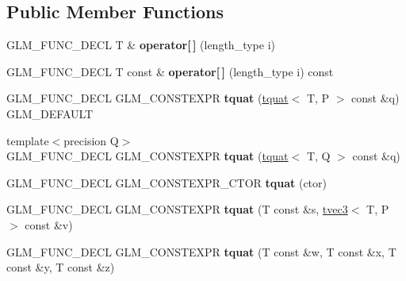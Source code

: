 \subsection*{Public Member Functions}
\begin{DoxyCompactItemize}
\item 
\mbox{\label{structglm_1_1tquat_a7c9434d6e90ddc03ed8b91770765303c}} 
G\+L\+M\+\_\+\+F\+U\+N\+C\+\_\+\+D\+E\+CL T \& {\bfseries operator\mbox{[}$\,$\mbox{]}} (length\+\_\+type i)
\item 
\mbox{\label{structglm_1_1tquat_a868440e3dade7ee013bf9114285b8790}} 
G\+L\+M\+\_\+\+F\+U\+N\+C\+\_\+\+D\+E\+CL T const  \& {\bfseries operator\mbox{[}$\,$\mbox{]}} (length\+\_\+type i) const
\item 
\mbox{\label{structglm_1_1tquat_aa7af0d1b2fd1ed7db63d48b241b295ca}} 
G\+L\+M\+\_\+\+F\+U\+N\+C\+\_\+\+D\+E\+CL G\+L\+M\+\_\+\+C\+O\+N\+S\+T\+E\+X\+PR {\bfseries tquat} (\hyperlink{structglm_1_1tquat}{tquat}$<$ T, P $>$ const \&q) G\+L\+M\+\_\+\+D\+E\+F\+A\+U\+LT
\item 
\mbox{\label{structglm_1_1tquat_aaf9a4d10e16ad975e4462b5c89ce724d}} 
{\footnotesize template$<$precision Q$>$ }\\G\+L\+M\+\_\+\+F\+U\+N\+C\+\_\+\+D\+E\+CL G\+L\+M\+\_\+\+C\+O\+N\+S\+T\+E\+X\+PR {\bfseries tquat} (\hyperlink{structglm_1_1tquat}{tquat}$<$ T, Q $>$ const \&q)
\item 
\mbox{\label{structglm_1_1tquat_a8a907726f9a12c025b8dbb572e951e36}} 
G\+L\+M\+\_\+\+F\+U\+N\+C\+\_\+\+D\+E\+CL G\+L\+M\+\_\+\+C\+O\+N\+S\+T\+E\+X\+P\+R\+\_\+\+C\+T\+OR {\bfseries tquat} (ctor)
\item 
\mbox{\label{structglm_1_1tquat_aa8e343ea23faf2cada6fc99d8e6eb597}} 
G\+L\+M\+\_\+\+F\+U\+N\+C\+\_\+\+D\+E\+CL G\+L\+M\+\_\+\+C\+O\+N\+S\+T\+E\+X\+PR {\bfseries tquat} (T const \&s, \hyperlink{structglm_1_1tvec3}{tvec3}$<$ T, P $>$ const \&v)
\item 
\mbox{\label{structglm_1_1tquat_ace891412cac049ef9bbafe069779a2c2}} 
G\+L\+M\+\_\+\+F\+U\+N\+C\+\_\+\+D\+E\+CL G\+L\+M\+\_\+\+C\+O\+N\+S\+T\+E\+X\+PR {\bfseries tquat} (T const \&w, T const \&x, T const \&y, T const \&z)

\end{DoxyCompactItemize}
